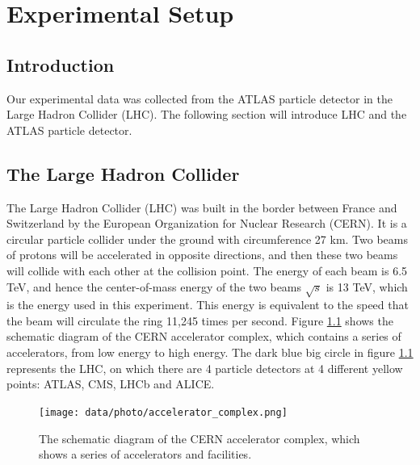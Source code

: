 \chapter{Experimental Setup}
\label{ch:detector}

\section{Introduction}
\label{sec:detector_introduction}

Our experimental data was collected from the ATLAS particle detector in the Large Hadron Collider (LHC).
The following section will introduce LHC and the ATLAS particle detector.

\section{The Large Hadron Collider}
\label{sec:detector_LHC}

The Large Hadron Collider (LHC) was built in the border between France and Switzerland by the European Organization for Nuclear Research (CERN).
It is a circular particle collider under the ground with circumference 27 km.
Two beams of protons will be accelerated in opposite directions, and then these two beams will collide with each other at the collision point.
The energy of each beam is 6.5 TeV, and hence the center-of-mass energy of the two beams $\sqrt{s}$ is 13 TeV, which is the energy used in this experiment.
This energy is equivalent to the speed that the beam will circulate the ring 11,245 times per second.
Figure \ref{fig:detector_LHC_accelerator_complex} shows the schematic diagram of the CERN accelerator complex, which contains a series of accelerators, from low energy to high energy.
The dark blue big circle in figure \ref{fig:detector_LHC_accelerator_complex} represents the LHC, on which there are 4 particle detectors at 4 different yellow points: ATLAS, CMS, LHCb and ALICE.

\begin{figure}
\centering
\texttt{[image: data/photo/accelerator\_complex.png]}
\caption{The schematic diagram of the CERN accelerator complex, which shows a series of accelerators and facilities. \cite{complex}}
\label{fig:detector_LHC_accelerator_complex}
\end{figure}

